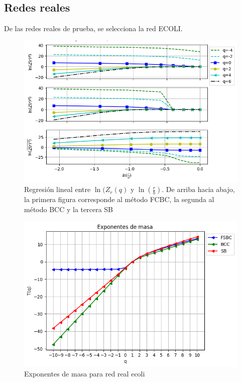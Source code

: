 \subsection{Redes reales}

De las redes reales de prueba, se selecciona la red ECOLI.

\begin{figure}[H]
    \centering
    \includegraphics[scale=0.7]{Capitulo4Multifractalidad/imagenes/a_TqLnrBCecoli.png}
    \caption{Regresión lineal entre $\ln(Z_r(q)$ y $\ln(\frac{r}{b})$. De arriba hacia abajo, la primera figura corresponde al método FCBC, la segunda al método BCC y la tercera SB}
\end{figure}

\begin{figure}[H]
    \centering
    \includegraphics[scale=0.7]{Capitulo4Multifractalidad/imagenes/a_Tqecoli.png}
    \caption{Exponentes de masa para red real ecoli}
\end{figure}

